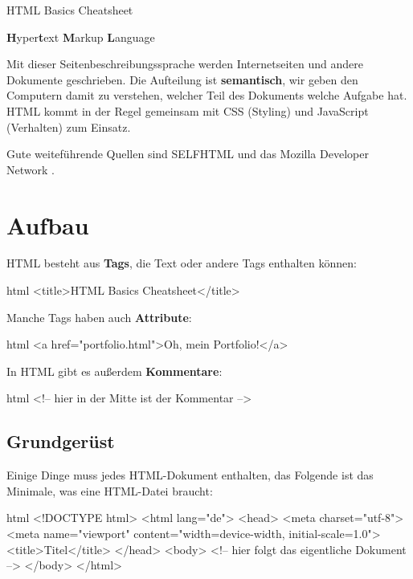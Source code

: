 \documentclass[10pt,a4paper]{article}
\begin{document}
{\color{accentcolor}HTML Basics Cheatsheet}

\begin{multicols}{3}

\scriptsize

\textbf{H}yper\textbf{t}ext \textbf{M}arkup \textbf{L}anguage

Mit dieser Seitenbeschreibungssprache werden Internetseiten und andere Dokumente geschrieben. Die Aufteilung ist \textbf{semantisch}, wir geben den Computern damit zu verstehen, welcher Teil des Dokuments welche Aufgabe hat. HTML kommt in der Regel gemeinsam mit CSS (Styling) und JavaScript (Verhalten) zum Einsatz.

Gute weiteführende Quellen sind SELFHTML \cite{selfhtml} und das Mozilla Developer Network \cite{mdn}.

\section*{Aufbau}



HTML besteht aus \textbf{Tags}, die Text oder andere Tags enthalten können:
\begin{codebox}{html}{}
<title>HTML Basics Cheatsheet</title>
\end{codebox}

Manche Tags haben auch \textbf{Attribute}:
\begin{codebox}{html}{}
<a href="portfolio.html">Oh, mein Portfolio!</a>
\end{codebox}

In HTML gibt es außerdem \textbf{Kommentare}:
\begin{codebox}{html}{}
<!-- hier in der Mitte ist der Kommentar -->
\end{codebox}


\subsection*{Grundgerüst}
Einige Dinge muss jedes HTML-Dokument enthalten, das Folgende ist das Minimale, was eine HTML-Datei braucht:
\begin{codebox}{html}{}
<!DOCTYPE html>
<html lang="de">
  <head>
    <meta charset="utf-8">
    <meta name="viewport" content="width=device-width, initial-scale=1.0">
    <title>Titel</title>
  </head>
  <body>
    <!-- hier folgt das eigentliche Dokument -->
  </body>
</html>
\end{codebox}



\end{multicols}
\end{document}
